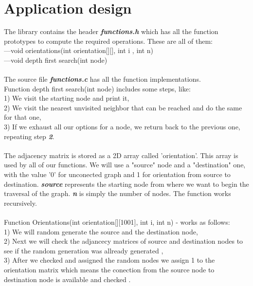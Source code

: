 \documentclass[14pt]{article}
\begin{document}
\newpage
\section*{Application design}
\vspace{10 mm}
The library contains the header \textbf{\textit{functions.h}} which has all the function prototypes to compute the required operations. These are all of them:
\\---void orientations(int orientation[][], int i , int n)
\\---void depth first search(int node)
\\\vspace{3 mm}
\\The source file \textbf{\textit{functions.c}} has all the function implementations.
\\Function depth first search(int node) includes some steps, like:
\\1) We visit the starting node and print it,\\
2) We visit the nearest unvisited neighbor that can be reached and do the same for that one,
\\3) If we exhaust all our options for a node, we return back to the previous one, repeating step \textbf{\textit{2}}.
\\\vspace{3 mm}
\\ The adjacency matrix is stored as a 2D array called 'orientation'. This array is used by all of our functions. We will use a "source" node and a "destination" one, with the value '0' for unconected graph and 1 for orientation from source to destination. \textbf{\textit{source}} represents the starting node from where we want to begin the traversal of the graph. \textbf{\textit{n}} is simply the number of nodes. The function works recursively.
\\\vspace{2 mm}
\\Function Orientations(int orientation[][1001], int i, int n) - works as follows: 
\\1) We will random generate the source and the destination node,\\
2) Next we will check the adjancecy matrices of source and destination nodes to see if the random generation was allready generated ,
\\3) After we checked and assigned the random nodes we assign 1 to the orientation matrix which means the conection from the source node to destination node is available and checked .
\end{document}
